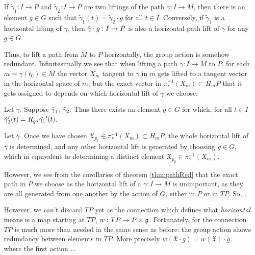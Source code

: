 \begin{theorem}\label{thm:pathRed}
If $\tilde{\gamma}_1: I \to P$ and $\tilde{\gamma}_2: I \to P$ are two liftings of the path $\gamma:I \to M$, then there is an element $g \in G$ such that $\tilde{\gamma}_1 (t) = \tilde{\gamma}_2 \cdot g$ for all $t \in I$. Conversely, if $\tilde{\gamma}_1$ is a horizontal lifting of $\gamma$, then $\Tilde{\gamma}\cdot g :I \to P$ is also a horizontal path lift of $\gamma$ for any $g\in G$.
\end{theorem}

Thus, to lift a path from $M$ to $P$ horizontally, the group action is somehow redundant. Infinitesimally we see that when lifting a path $\gamma:I \to M$ to $P$, for each $m = \gamma(t_0) \in M$ the vector $X_m$ tangent to $\gamma$ in $m$ gets lifted to a tangent vector in the horizontal space of $m$, but the exact vector in $\pi_*^{-1}(X_m) \subset H_mP$ that it gets assigned to depends on which horizontal lift of $\gamma$ we choose.

\begin{corollary}\label{cor:tpRed}
Let $\gamma$. Suppose $\Tilde{\gamma}_1$, $\Tilde{\gamma}_2$. Thus there exists an element $g \in G$ for which, for all $t \in I$ $\Tilde{\gamma}_2'(t) = R_{g*}\Tilde{\gamma_1}'(t)$.
\end{corollary}


\begin{corollary}
Let $\gamma$. Once we have chosen $\mathfrak{X}_{p_1} \in \pi_*^{-1}(X_m) \subset H_mP$, the whole horizontal lift of $\gamma$ is determined, and any other horizontal lift is generated by choosing $g \in G$, which in equivalent to determining a distinct element $\mathfrak{X}_{p_2} \in \pi_*^{-1}(X_m)$.
\end{corollary}

However, we see from the corollaries of theorem \ref{thm:pathRed} that the exact path in $P$ we choose as the horizontal lift of a $\gamma:I \to M$ is unimportant, as they are all generated from one another by the action of $G$, either in $P$ or in $TP$. So, .

However, we can't discard $TP$ yet as the connection which defines what \emph{horizontal} means is  a map starting at $TP$,  $w:TP \to P\times \mathfrak{g}$. Fortunately, for the connection $TP$ is much more than needed in the same sense as before: the group action shows redundancy between elements in $TP$. More precisely $w(\mathfrak{X}\cdot g) = w(\mathfrak{X}) \cdot g$, where the first action ...

